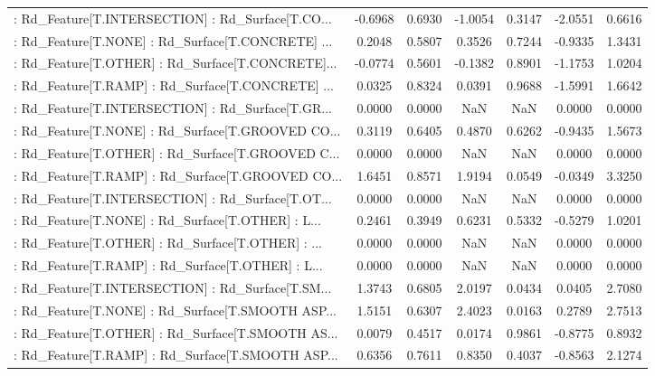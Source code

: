 \begin{longtable}{p{4cm}cccccc}
 : Rd\_Feature[T.INTERSECTION] : Rd\_Surface[T.CO... & -0.6968 &    0.6930 & -1.0054 &       0.3147 & -2.0551 &  0.6616 \\
 : Rd\_Feature[T.NONE] : Rd\_Surface[T.CONCRETE] ... &  0.2048 &    0.5807 &  0.3526 &       0.7244 & -0.9335 &  1.3431 \\
 : Rd\_Feature[T.OTHER] : Rd\_Surface[T.CONCRETE]... & -0.0774 &    0.5601 & -0.1382 &       0.8901 & -1.1753 &  1.0204 \\
 : Rd\_Feature[T.RAMP] : Rd\_Surface[T.CONCRETE] ... &  0.0325 &    0.8324 &  0.0391 &       0.9688 & -1.5991 &  1.6642 \\
 : Rd\_Feature[T.INTERSECTION] : Rd\_Surface[T.GR... &  0.0000 &    0.0000 &     NaN &          NaN &  0.0000 &  0.0000 \\
 : Rd\_Feature[T.NONE] : Rd\_Surface[T.GROOVED CO... &  0.3119 &    0.6405 &  0.4870 &       0.6262 & -0.9435 &  1.5673 \\
 : Rd\_Feature[T.OTHER] : Rd\_Surface[T.GROOVED C... &  0.0000 &    0.0000 &     NaN &          NaN &  0.0000 &  0.0000 \\
 : Rd\_Feature[T.RAMP] : Rd\_Surface[T.GROOVED CO... &  1.6451 &    0.8571 &  1.9194 &       0.0549 & -0.0349 &  3.3250 \\
 : Rd\_Feature[T.INTERSECTION] : Rd\_Surface[T.OT... &  0.0000 &    0.0000 &     NaN &          NaN &  0.0000 &  0.0000 \\
 : Rd\_Feature[T.NONE] : Rd\_Surface[T.OTHER] : L... &  0.2461 &    0.3949 &  0.6231 &       0.5332 & -0.5279 &  1.0201 \\
 : Rd\_Feature[T.OTHER] : Rd\_Surface[T.OTHER] : ... &  0.0000 &    0.0000 &     NaN &          NaN &  0.0000 &  0.0000 \\
 : Rd\_Feature[T.RAMP] : Rd\_Surface[T.OTHER] : L... &  0.0000 &    0.0000 &     NaN &          NaN &  0.0000 &  0.0000 \\
 : Rd\_Feature[T.INTERSECTION] : Rd\_Surface[T.SM... &  1.3743 &    0.6805 &  2.0197 &       0.0434 &  0.0405 &  2.7080 \\
 : Rd\_Feature[T.NONE] : Rd\_Surface[T.SMOOTH ASP... &  1.5151 &    0.6307 &  2.4023 &       0.0163 &  0.2789 &  2.7513 \\
 : Rd\_Feature[T.OTHER] : Rd\_Surface[T.SMOOTH AS... &  0.0079 &    0.4517 &  0.0174 &       0.9861 & -0.8775 &  0.8932 \\
 : Rd\_Feature[T.RAMP] : Rd\_Surface[T.SMOOTH ASP... &  0.6356 &    0.7611 &  0.8350 &       0.4037 & -0.8563 &  2.1274 \\

\end{longtable}
